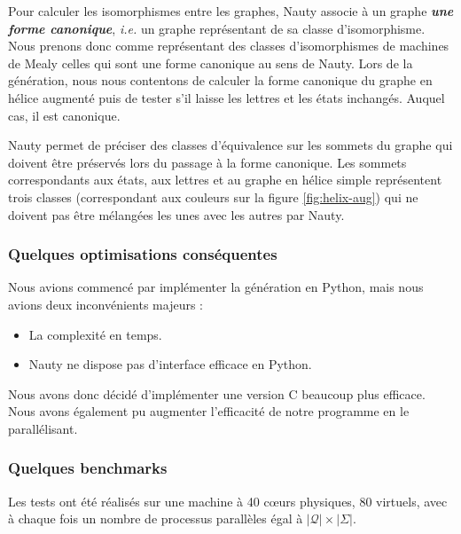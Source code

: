 \documentclass[11pt,a4paper]{article}
\begin{document}
Pour calculer les isomorphismes entre les graphes, \textrm{Nauty} associe à un graphe \textit{\textbf{une forme canonique}}, \emph{i.e.} un graphe représentant de sa classe d'isomorphisme. Nous prenons donc comme représentant des classes d'isomorphismes de machines de Mealy celles qui sont une forme canonique au sens de \textrm{Nauty}. Lors de la génération, nous nous contentons de calculer la forme canonique du graphe en hélice augmenté puis de tester s'il laisse les lettres et les états inchangés. Auquel cas, il est canonique.

Nauty permet de préciser des classes d'équivalence sur les sommets du graphe qui doivent être préservés lors du passage à la forme canonique. Les sommets correspondants aux états, aux lettres et au graphe en hélice simple représentent trois classes (correspondant aux couleurs sur la figure \ref{fig:helix-aug}) qui ne doivent pas être mélangées les unes avec les autres par \textrm{Nauty}.

\subsubsection*{Quelques optimisations conséquentes}
Nous avions commencé par implémenter la génération en \textrm{Python}, mais nous avions deux inconvénients majeurs :
\begin{itemize}
\item La complexité en temps.
\item \textrm{Nauty} ne dispose pas d'interface efficace en Python.
\end{itemize}

Nous avons donc décidé d'implémenter une version C beaucoup plus efficace. Nous avons également pu augmenter l'efficacité de notre programme en le parallélisant.

\subsubsection*{Quelques benchmarks}

Les tests ont été réalisés sur une machine à 40 cœurs physiques, 80 virtuels, avec à chaque fois un nombre de processus parallèles égal à $|\mathcal{Q}|\times|\Sigma|$.
\end{document}

